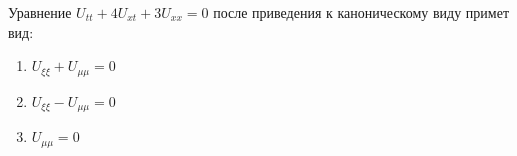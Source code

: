 Уравнение \(U_{tt}+4U_{xt}+3U_{xx}=0\) после приведения к каноническому виду примет вид:

\begin{enumerate}[label=\arabic*)]
    \item \(U_{\xi \xi }+U_{\mu \mu }=0\)
    \item \(U_{\xi \xi }-U_{\mu \mu }=0\)
    \item \(U_{\mu \mu }=0\)
\end{enumerate}

